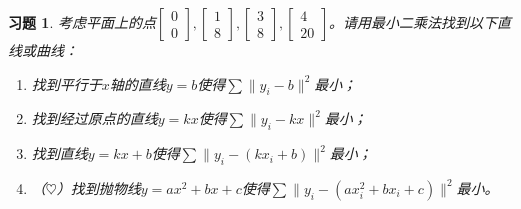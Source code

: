 \documentclass[UTF8]{ctexart}
\newtheorem{ex}[thm]{习题}
\begin{document}
\begin{ex}
考虑平面上的点$\begin{bmatrix}0\\0\end{bmatrix},\begin{bmatrix}1\\8\end{bmatrix},\begin{bmatrix}3\\8\end{bmatrix},\begin{bmatrix}4\\20\end{bmatrix}$。请用最小二乘法找到以下直线或曲线：
\begin{enumerate}
\item 找到平行于$x$轴的直线$y=b$使得$\sum\| y_i-b\|^2$最小；
\item 找到经过原点的直线$y=kx$使得$\sum\| y_i-kx\|^2$最小；
\item 找到直线$y=kx+b$使得$\sum\| y_i-(kx_i+b)\|^2$最小；
\item （$\heartsuit $）找到抛物线$y=ax^2+bx+c$使得$\sum\| y_i-(ax_i^2+bx_i+c)\|^2$最小。
\end{enumerate}
\end{ex}
\end{document}

